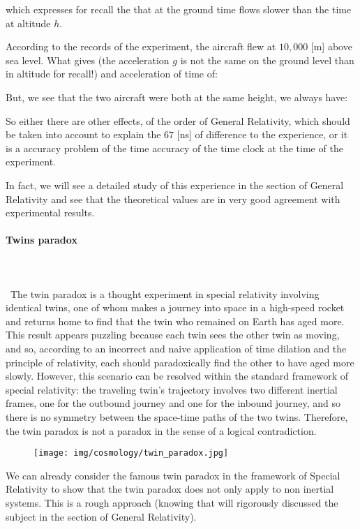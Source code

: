 	which expresses for recall the that at the ground time flows slower than the time at altitude $h$.
	
	According to the records of the experiment, the aircraft flew at $10,000$ [m] above sea level. What gives (the acceleration $g$ is not the same on the ground level than in altitude for recall!) and acceleration of time of:
	
	But, we see that the two aircraft were both at the same height, we always have:
	
	So either there are other effects, of the order of General Relativity, which should be taken into account to explain the $67$ [ns] of difference to the experience, or it is a accuracy problem of the time accuracy of the time clock at the time of the experiment.

	In fact, we will see a detailed study of this experience in the section of General Relativity and see that the theoretical values are in very good agreement with experimental results.
	
	\paragraph{Twins paradox}\mbox{}\\\\\
	The twin paradox is a thought experiment in special relativity involving identical twins, one of whom makes a journey into space in a high-speed rocket and returns home to find that the twin who remained on Earth has aged more. This result appears puzzling because each twin sees the other twin as moving, and so, according to an incorrect and naive application of time dilation and the principle of relativity, each should paradoxically find the other to have aged more slowly. However, this scenario can be resolved within the standard framework of special relativity: the traveling twin's trajectory involves two different inertial frames, one for the outbound journey and one for the inbound journey, and so there is no symmetry between the space-time paths of the two twins. Therefore, the twin paradox is not a paradox in the sense of a logical contradiction.
	\begin{figure}[H]
		\begin{center}
		\texttt{[image: img/cosmology/twin\_paradox.jpg]}
		\end{center}
	\end{figure}
	We can already consider the famous twin paradox in the framework of Special Relativity to show that the twin paradox does not only apply to non inertial systems. This is a rough approach (knowing that will rigorously discussed the subject in the section of General Relativity).

